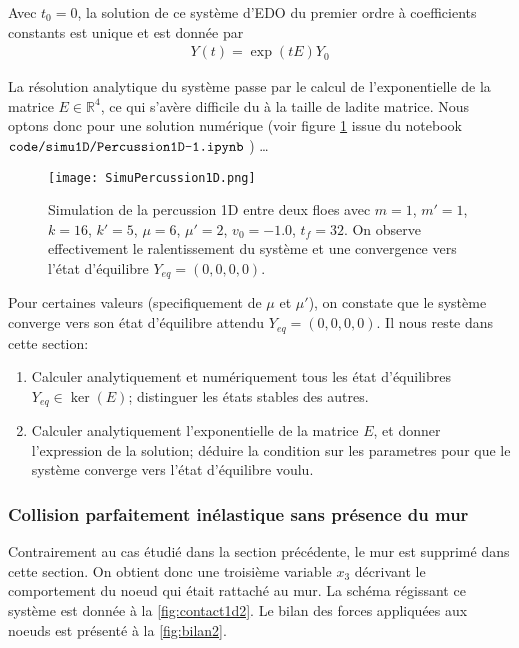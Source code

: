 \noindent Avec $t_0= 0$, la solution de ce système d'EDO du premier ordre à coefficients constants est unique et est donnée par
\begin{align}
    Y(t) = \exp(tE)Y_0
\end{align}

La résolution analytique du système passe par le calcul de l'exponentielle de la matrice $E \in \mathbb{R}^4$, ce qui s'avère difficile du à la taille de ladite matrice. Nous optons donc pour une solution numérique (voir figure \cref{fig:simucontact1d} issue du notebook $\verb|code/simu1D/Percussion1D-1.ipynb|$ ) \ldots
\begin{figure}[!h]
    \centering
    \texttt{[image: SimuPercussion1D.png]}
    \caption{Simulation de la percussion 1D entre deux floes avec $m=1$, $m'=1$, $k=16$, $k'=5$, $\mu=6$,
        $\mu'=2$, $v_0=-1.0$, $t_{f}=32$. On observe effectivement le ralentissement du système et une convergence
        vers l'état d'équilibre $Y_{eq}= (0,0,0,0)$.}
    \label{fig:simucontact1d}
\end{figure}

\noindent Pour certaines valeurs (specifiquement de $\mu$ et $\mu'$), on constate que le système converge vers son état d'équilibre attendu $Y_{eq} = (0,0,0,0)$. Il nous reste dans cette section:
\begin{enumerate}
    \item Calculer analytiquement et numériquement tous les état d'équilibres $Y_{eq} \in \ker(E)$; distinguer les états stables des autres.
    \item Calculer analytiquement l'exponentielle de la matrice $E$, et donner l'expression de la solution; déduire la condition sur les parametres pour que le système converge vers l'état d'équilibre voulu.
\end{enumerate} 










\subsubsection{Collision parfaitement inélastique sans présence du mur}

Contrairement au cas étudié dans la section précédente, le mur est supprimé dans cette section. On obtient donc une troisième variable $x_3$ décrivant le comportement du noeud qui était rattaché au mur. La schéma régissant ce système est donnée à la \cref{fig:contact1d2}. Le bilan des forces appliquées aux noeuds est présenté à la \cref{fig:bilan2}.

